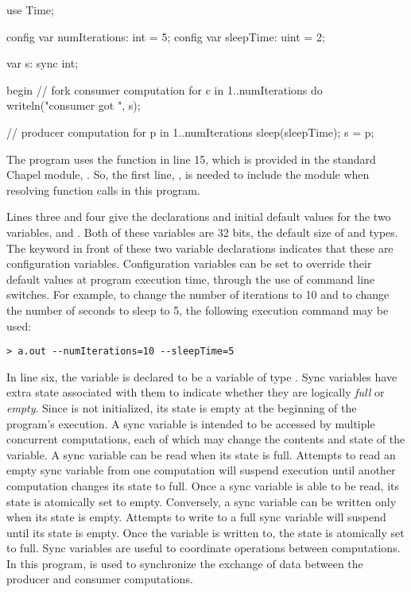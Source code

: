 \begin{numberedchapel}
use Time;

config var numIterations: int = 5;
config var sleepTime: uint = 2;

var s: sync int;

begin {  // fork consumer computation
  for c in 1..numIterations do
    writeln("consumer got ", s);
}

// producer computation
for p in 1..numIterations {
  sleep(sleepTime);
  s = p;
}
\end{numberedchapel}

The program uses the  function in line 15, which is provided in the
standard Chapel module, .  So, the first line, , 
is needed to include the  module when resolving 
function calls in this program.  

Lines three and four give the declarations and initial default values
for the two variables,  and .
Both of these variables are 32 bits, the default size of  and  types.
The  keyword in front of these two variable declarations 
indicates that these are configuration variables.  Configuration variables 
can be set to override their default values at program execution time, through the 
use of command line switches.  For example, to change the number of iterations to 10
and to change the number of seconds to sleep to 5, the following execution command 
may be used:
\begin{verbatim}
> a.out --numIterations=10 --sleepTime=5
\end{verbatim}

In line six, the variable  is declared to be a  variable 
of type .  Sync variables have extra state associated with them to 
indicate whether they are logically {\em full} or {\em empty}.  Since 
is not initialized, its state is empty at the beginning of the program's execution.
A sync variable
is intended to be accessed by multiple concurrent computations, each of which may
change the contents and state of the variable.  A sync variable
can be read when its state is full.  Attempts to read an empty sync variable from one
computation will suspend execution until another computation changes its state to full.  
Once a sync variable is able to be read, its state is atomically set to empty.  
Conversely, a sync variable can be written only when its state is empty.  Attempts
to write to a full sync variable will suspend until its state is empty.  Once the variable
is written to, the state is atomically set to full.  Sync variables are useful
to coordinate operations between computations.  In this program,  is used
to synchronize the exchange of data between the producer and consumer computations.

